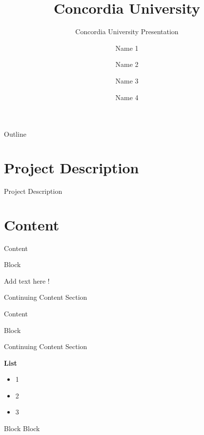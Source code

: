 \documentclass{beamer}
\title[]{Concordia University}
\subtitle{Concordia University Presentation}
\author[]{Name 1 \\ \and Name 2\\ \and Name 3\\ \and Name 4\\}
\institute[] %
{
  Concordia Team\\
}
\date{}
\begin{document}
\begin{frame}
\titlepage
\end{frame}

\begin{frame}{Outline}
  \tableofcontents
\end{frame}

\section{Project Description}
\begin{frame}{Project Description}

\end{frame}


\section{Content}
\begin{frame}{Content}

\begin{block}{Block}

Add text here ! 

\end{block}
\end{frame}

\begin{frame}{Continuing Content Section}

\begin{block}{Content}

Block

\end{block}

\end{frame}

\begin{frame}{Continuing Content Section}

\textbf{List}

\begin{itemize}
  \item {
   1
  }
   \item {
    2
  }
  \item {
    3
  }
  \end{itemize}
  
\begin{block}{Block}
  Block
\end{block}

\end{frame}
\end{document}
